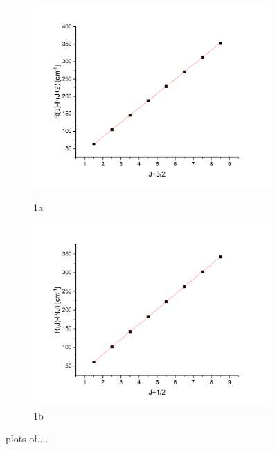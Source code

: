 \documentclass[twocolumn]{article} %
\begin{document}
\begin{figure}[h!]
    \begin{subfigure}[b]{0.95\columnwidth}
        \caption{1a}
        \includegraphics[width=\columnwidth]{HCl-35-B0.png}
        \label{fig:sfig1}
    \end{subfigure}
    \begin{subfigure}[b]{0.95\columnwidth}
      \includegraphics[width=\columnwidth]{HCl-35-B1.png}
      \caption{1b}
      \label{fig:sfig2}
    \end{subfigure}
    \caption{plots of....}
\end{figure}
\end{document}
